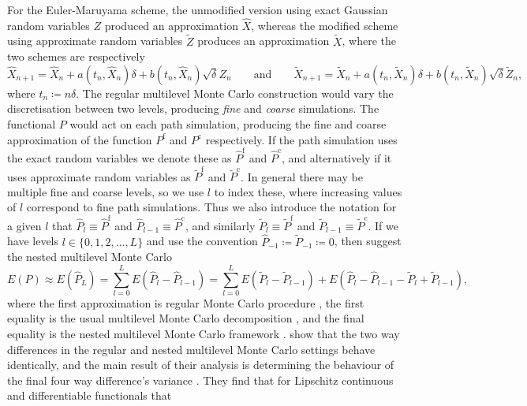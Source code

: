 \documentclass[manuscript,review]{acmart}
\begin{document}
For the Euler-Maruyama scheme, the unmodified version using exact Gaussian random variables $ Z $ produced an approximation $ \hat{X} $, whereas the modified scheme using approximate random variables $ \tilde{Z} $ produces an approximation $ \tilde{X} $, where the two schemes are respectively
\begin{equation*}
\hat{X}_{n+1} = \hat{X}_n + a(t_n, \hat{X}_n) \delta + b(t_n, \hat{X}_n)\sqrt{\delta} Z_n
\qquad \text{and} \qquad 
\tilde{X}_{n+1} = \tilde{X}_n + a(t_n, \tilde{X}_n) \delta + b(t_n, \tilde{X}_n)\sqrt{\delta} \tilde{Z}_n,
\end{equation*}
where $ t_n \coloneqq n \delta $. The regular multilevel Monte Carlo construction would vary the discretisation between two levels, producing \emph{fine} and \emph{coarse} simulations. The functional $ P $ would act on each path simulation, producing the fine and coarse approximation of the function $ P^{\mathrm{f}} $ and $ P^{\mathrm{c}} $ respectively. If the path simulation uses the exact random variables we denote these as $ \hat{P}^{\mathrm{f}} $ and $ \hat{P}^{\mathrm{c}} $, and alternatively if it uses approximate random variables as $ \tilde{P}^{\mathrm{f}} $ and $ \tilde{P}^{\mathrm{c}} $. In general there may be multiple fine and coarse levels, so we use $ l $ to index these, where increasing values of $ l $ correspond to fine path simulations. Thus we also introduce the notation for a given $ l $ that $ \hat{P}_l \equiv \hat{P}^{\mathrm{f}} $ and $ \hat{P}_{l-1} \equiv \hat{P}^{\mathrm{c}} $, and similarly $ \tilde{P}_l \equiv \tilde{P}^{\mathrm{f}} $ and $ \tilde{P}_{l-1} \equiv \tilde{P}^{\mathrm{c}} $. If we have levels $ l \in \{0, 1, 2, \ldots, L\} $ and use the convention $ \hat{P}_{-1} \coloneqq \tilde{P}_{-1} \coloneqq 0 $, then \citet{giles2020approximate} suggest the nested multilevel Monte Carlo
\begin{equation*}
E(P) 
\approx
E(\hat{P}_L) 
= 
\sum_{l = 0}^{L} E(\hat{P}_l - \hat{P}_{l-1}) 
= 
\sum_{l = 0}^{L} E(\tilde{P}_l - \tilde{P}_{l-1}) +  E(\hat{P}_l - \hat{P}_{l-1} - \tilde{P}_l + \tilde{P}_{l-1}),
\end{equation*}
where the first approximation is regular Monte Carlo procedure \citep{glasserman2013monte}, the first equality is the usual multilevel Monte Carlo decomposition \citep{giles2008multilevel}, and the final equality is the nested multilevel Monte Carlo framework \citep{giles2020approximate,sheridan2020nested}.
\citeauthor{giles2020approximate} \citep{giles2020approximate,sheridan2020nested} show that the two way differences in the regular and nested multilevel Monte Carlo settings behave identically, and the main result of their analysis is determining the behaviour of the final four way difference's variance \citep[lemmas~4.10 and 4.11]{giles2020approximate} \citep[corollaries~6.2.6.2 and 6.2.6.3]{sheridan2020nested}. They find that for Lipschitz continuous and differentiable functionals that 
\end{document}
